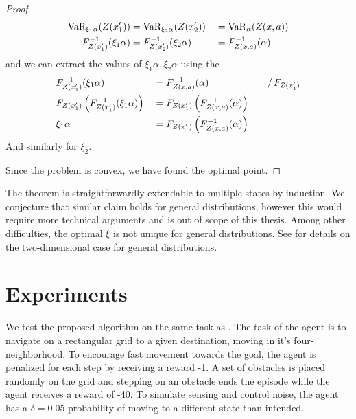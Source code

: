 \begin{proof}
\begin{equation*}
\begin{split}
\text{VaR}_{\xi_1\alpha}(Z(x_1')) &= \text{VaR}_{\xi_2\alpha}(Z(x_2')) &&= \text{VaR}_\alpha(Z(x, a))\\
F^{-1}_{Z(x_1')}(\xi_1\alpha) &= F^{-1}_{Z(x_2')}(\xi_2\alpha) &&= F^{-1}_{Z(x, a)}(\alpha)
\end{split}
\end{equation*}
and we can extract the values of $\xi_1\alpha, \xi_2\alpha$ using the 
\begin{equation*}
\begin{split}
&F^{-1}_{Z(x_1')}(\xi_1\alpha) &&= F^{-1}_{Z(x, a)}(\alpha) &&&/ \, F_{Z(x_1')}\\
&F_{Z(x_1')}\left( {F^{-1}_{Z(x_1')}(\xi_1\alpha)} \right) &&= F_{Z(x_1')}\left( {F^{-1}_{Z(x, a)}(\alpha)} \right)\\
&\xi_1\alpha &&= F_{Z(x_1')}\left( {F^{-1}_{Z(x, a)}(\alpha)} \right)
\end{split}
\end{equation*}
And similarly for $\xi_2$.

Since the problem is convex, we have found the optimal point.

\end{proof}

The theorem is straightforwardly extendable to multiple states by induction. We conjecture that similar claim holds for general distributions, however this would require more technical arguments and is out of scope of this thesis. Among other difficulties, the optimal $\xi$ is not unique for general distributions. See \citet{bernard2015quantile} for details on the two-dimensional case for general distributions.





\section{Experiments}\label{sec:vi:experiments}

We test the proposed algorithm on the same task as \citet{chow2015risk}. The task of the agent is to navigate on a rectangular grid to a given destination, moving in it's four-neighborhood. To encourage fast movement towards the goal, the agent is penalized for each step by receiving a reward -1. A set of obstacles is placed randomly on the grid and stepping on an obstacle ends the episode while the agent receives a reward of -40.
To simulate sensing and control noise, the agent has a $\delta=0.05$ probability of moving to a different state than intended.

